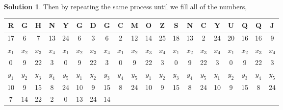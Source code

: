 \documentclass[11pt]{article}
\theoremstyle{definition}\newtheorem{definition}{Definition}
\theoremstyle{definition}\newtheorem{question}{Question}
\theoremstyle{definition}\newtheorem*{solution}{Solution}
\begin{document}
\begin{solution}
        Then by repeating the same process until we fill all of the numbers, 
        \begin{center}
            \begin{tabular}{|cccccccccccccccccccc|}
                \hline
                R     & G     & H     & N                          & \multicolumn{1}{c|}{Y}     & G     & D     & G                          & C     & \multicolumn{1}{c|}{M}     & O     & Z                          & S     & N     & \multicolumn{1}{c|}{C}     & Y                          & U     & Q     & Q     & J     \\ \hline
                17    & 6     & 7     & 13                         & 24                         & 6     & 3     & 6                          & 2     & 12                         & 14    & 25                         & 18    & 13    & 2                          & 24                         & 20    & 16    & 16    & 9     \\ \hline
                $x_1$ & $x_2$ & $x_3$ & \multicolumn{1}{c|}{$x_4$} & $x_1$                      & $x_2$ & $x_3$ & \multicolumn{1}{c|}{$x_4$} & $x_1$ & $x_2$                      & $x_3$ & \multicolumn{1}{c|}{$x_4$} & $x_1$ & $x_2$ & $x_3$                      & \multicolumn{1}{c|}{$x_4$} & $x_1$ & $x_2$ & $x_3$ & $x_4$ \\ \hline
                0     & 9     & 22    & \multicolumn{1}{c|}{3}     & 0                          & 9     & 22    & \multicolumn{1}{c|}{3}     & 0     & 9                          & 22    & \multicolumn{1}{c|}{3}     & 0     & 9     & 22                         & \multicolumn{1}{c|}{3}     & 0     & 9     & 22    & 3     \\ \hline
                $y_1$ & $y_2$ & $y_3$ & $y_4$                      & \multicolumn{1}{c|}{$y_5$} & $y_1$ & $y_2$ & $y_3$                      & $y_4$ & \multicolumn{1}{c|}{$y_5$} & $y_1$ & $y_2$                      & $y_3$ & $y_4$ & \multicolumn{1}{c|}{$y_5$} & $y_1$                      & $y_2$ & $y_3$ & $y_4$ & $y_5$ \\ \hline
                10    & 9     & 15    & 8                          & \multicolumn{1}{c|}{24}    & 10    & 9     & 15                         & 8     & \multicolumn{1}{c|}{24}    & 10    & 9                          & 15    & 8     & \multicolumn{1}{c|}{24}    & 10                         & 9     & 15    & 8     & 24    \\ \hline
                7     & 14    & 22    & 2                          & \multicolumn{1}{c|}{0}     & 13    & 24    & \multicolumn{1}{c|}{14}    &       &                            &       &                            &       &       &                            &                            &       &       &       &       \\ \cline{1-8}

\end{tabular}
\end{center}
\end{solution}
\end{document}
